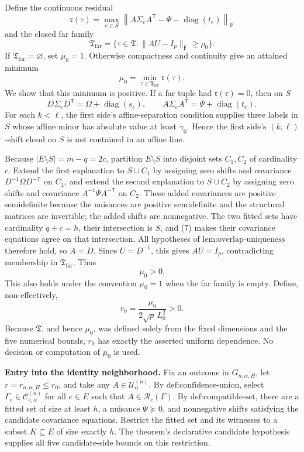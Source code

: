 Define the continuous residual
\[
\mathfrak r(\tau)=
\max_{e\in S}
\left\|A\Sigma_eA^{\mathsf T}
-\Psi-\operatorname{diag}(t_e)\right\|_{\mathrm F}
\]
and the closed far family
\[
\mathfrak T_{\mathrm{far}}
=\{\tau\in\mathfrak T:\|AU-I_p\|_{\mathrm F}\geq\rho_0\}.
\]
If \(\mathfrak T_{\mathrm{far}}=\varnothing\), set \(\mu_0=1\). Otherwise compactness and continuity give an attained minimum
\[
\mu_0=\min_{\tau\in\mathfrak T_{\mathrm{far}}}\mathfrak r(\tau).
\tag{6}
\]
We show that this minimum is positive. If a far tuple had \(\mathfrak r(\tau)=0\), then on \(S\)
\[
D\Sigma_eD^{\mathsf T}=\Omega+\operatorname{diag}(s_e),
\qquad
A\Sigma_eA^{\mathsf T}=\Psi+\operatorname{diag}(t_e).
\tag{7}
\]
For each \(k<\ell\), the first side's affine-separation condition supplies three labels in \(S\) whose affine minor has absolute value at least \(\gamma_0\). Hence the first side's \((k,\ell)\)-shift cloud on \(S\) is not contained in an affine line.

Because \(|E\setminus S|=m-q=2c\), partition \(E\setminus S\) into disjoint sets \(C_1,C_2\) of cardinality \(c\). Extend the first explanation to \(S\cup C_1\) by assigning zero shifts and covariance \(D^{-1}\Omega D^{-\mathsf T}\) on \(C_1\), and extend the second explanation to \(S\cup C_2\) by assigning zero shifts and covariance \(A^{-1}\Psi A^{-\mathsf T}\) on \(C_2\). These added covariances are positive semidefinite because the nuisances are positive semidefinite and the structural matrices are invertible; the added shifts are nonnegative. The two fitted sets have cardinality \(q+c=h\), their intersection is \(S\), and (7) makes their covariance equations agree on that intersection. All hypotheses of \(\text{lem:overlap-uniqueness}\) therefore hold, so \(A=D\). Since \(U=D^{-1}\), this gives \(AU=I_p\), contradicting membership in \(\mathfrak T_{\mathrm{far}}\). Thus
\[
\mu_0>0.
\tag{8}
\]
This also holds under the convention \(\mu_0=1\) when the far family is empty. Define, non-effectively,
\[
r_0=\frac{\mu_0}{2\sqrt p\,L_0^2}>0.
\tag{9}
\]
Because \(\mathfrak T\), and hence \(\mu_0\), was defined solely from the fixed dimensions and the five numerical bounds, \(r_0\) has exactly the asserted uniform dependence. No decision or computation of \(\mu_0\) is used.

\textbf{Entry into the identity neighborhood.}
Fix an outcome in \(G_{n,\alpha,H}\), let \(r=r_{n,\alpha,H}\leq r_0\), and take any \(A\in\mathcal U^{(n)}_\alpha\). By \(\text{def:confidence-union}\), select \(\Gamma_e\in\mathcal C^{(n)}_{e,\alpha}\) for all \(e\in E\) such that \(A\in\mathcal R_c(\Gamma)\). By \(\text{def:compatible-set}\), there are a fitted set of size at least \(h\), a nuisance \(\Psi\succeq0\), and nonnegative shifts satisfying the candidate covariance equations. Restrict the fitted set and its witnesses to a subset \(K\subseteq E\) of size exactly \(h\). The theorem's declarative candidate hypothesis supplies all five candidate-side bounds on this restriction.

